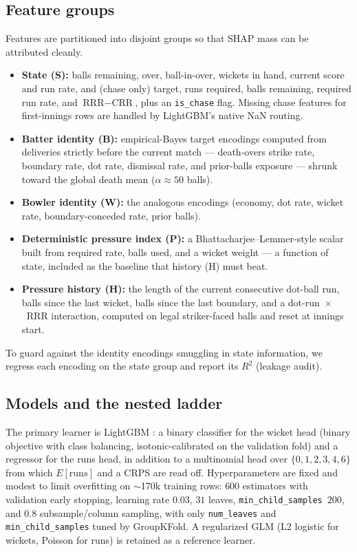 \subsection{Feature groups}
\label{sec:features}
Features are partitioned into disjoint groups so that SHAP mass can be attributed
cleanly.
\begin{itemize}
  \item \textbf{State (S):} balls remaining, over, ball-in-over, wickets in hand,
        current score and run rate, and (chase only) target, runs required, balls
        remaining, required run rate, and $\text{RRR} - \text{CRR}$, plus an
        \texttt{is\_chase} flag. Missing chase features for first-innings rows are
        handled by LightGBM's native NaN routing.
  \item \textbf{Batter identity (B):} empirical-Bayes target encodings computed
        from deliveries strictly before the current match --- death-overs strike
        rate, boundary rate, dot rate, dismissal rate, and prior-balls exposure
        --- shrunk toward the global death mean ($\alpha \approx 50$ balls).
  \item \textbf{Bowler identity (W):} the analogous encodings (economy, dot rate,
        wicket rate, boundary-conceded rate, prior balls).
  \item \textbf{Deterministic pressure index (P):} a Bhattacharjee--Lemmer-style
        scalar built from required rate, balls used, and a wicket weight --- a
        function of state, included as the baseline that history (H) must beat.
  \item \textbf{Pressure history (H):} the length of the current consecutive
        dot-ball run, balls since the last wicket, balls since the last boundary,
        and a dot-run~$\times$~RRR interaction, computed on legal striker-faced
        balls and reset at innings start.
\end{itemize}
To guard against the identity encodings smuggling in state information, we
regress each encoding on the state group and report its $R^2$ (leakage audit).

\subsection{Models and the nested ladder}
\label{sec:ladder}
The primary learner is LightGBM \citep{ke2017lightgbm}: a binary classifier for
the wicket head (binary objective with class balancing,
isotonic-calibrated on the validation fold) and a regressor for the runs head, in
addition to a multinomial head over $\{0,1,2,3,4,6\}$ from which $E[\text{runs}]$
and a CRPS are read off. Hyperparameters are fixed and modest to limit
overfitting on $\sim$170k training rows: $600$ estimators with validation early
stopping, learning rate $0.03$, $31$ leaves, \texttt{min\_child\_samples}~$200$,
and $0.8$ subsample/column sampling, with only \texttt{num\_leaves} and
\texttt{min\_child\_samples} tuned by GroupKFold. A regularized GLM (L2 logistic
for wickets, Poisson for runs) is retained as a reference learner.

